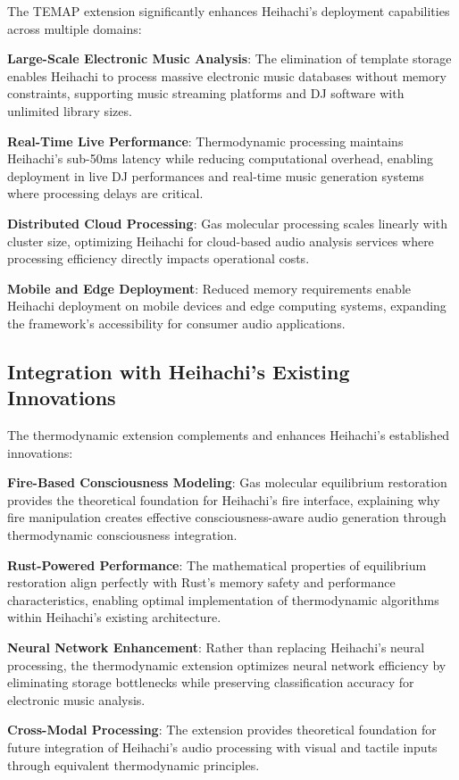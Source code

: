 \documentclass[12pt,a4paper]{article}
\begin{document}
The TEMAP extension significantly enhances Heihachi's deployment capabilities across multiple domains:

\textbf{Large-Scale Electronic Music Analysis}: The elimination of template storage enables Heihachi to process massive electronic music databases without memory constraints, supporting music streaming platforms and DJ software with unlimited library sizes.

\textbf{Real-Time Live Performance}: Thermodynamic processing maintains Heihachi's sub-50ms latency while reducing computational overhead, enabling deployment in live DJ performances and real-time music generation systems where processing delays are critical.

\textbf{Distributed Cloud Processing}: Gas molecular processing scales linearly with cluster size, optimizing Heihachi for cloud-based audio analysis services where processing efficiency directly impacts operational costs.

\textbf{Mobile and Edge Deployment}: Reduced memory requirements enable Heihachi deployment on mobile devices and edge computing systems, expanding the framework's accessibility for consumer audio applications.

\subsection{Integration with Heihachi's Existing Innovations}

The thermodynamic extension complements and enhances Heihachi's established innovations:

\textbf{Fire-Based Consciousness Modeling}: Gas molecular equilibrium restoration provides the theoretical foundation for Heihachi's fire interface, explaining why fire manipulation creates effective consciousness-aware audio generation through thermodynamic consciousness integration.

\textbf{Rust-Powered Performance}: The mathematical properties of equilibrium restoration align perfectly with Rust's memory safety and performance characteristics, enabling optimal implementation of thermodynamic algorithms within Heihachi's existing architecture.

\textbf{Neural Network Enhancement}: Rather than replacing Heihachi's neural processing, the thermodynamic extension optimizes neural network efficiency by eliminating storage bottlenecks while preserving classification accuracy for electronic music analysis.

\textbf{Cross-Modal Processing}: The extension provides theoretical foundation for future integration of Heihachi's audio processing with visual and tactile inputs through equivalent thermodynamic principles.
\end{document}
